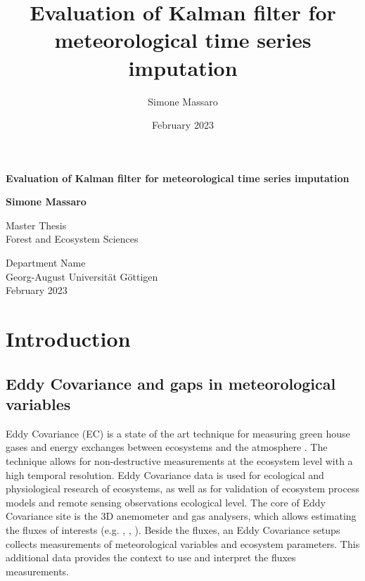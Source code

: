 \documentclass{article}
\title{Evaluation of Kalman filter for meteorological time series imputation}
\author{Simone Massaro}
\date{February 2023}
\let\Oldsection\section
\renewcommand{\section}{\FloatBarrier\Oldsection}
\let\Oldsubsection\subsection
\renewcommand{\subsection}{\FloatBarrier\Oldsubsection}
\begin{document}
\begin{titlepage}
    \begin{center}
        \vspace*{1cm}
            
        \Huge
        \textbf{Evaluation of Kalman filter for meteorological time series imputation}
            
        \vspace{0.5cm}
        \LARGE
            
        \vspace{1.5cm}
            
        \textbf{Simone Massaro}
            
        \vfill
            
        Master Thesis\\
        Forest and Ecosystem Sciences
            
        \vspace{0.3cm}
            
        \Large
        Department Name\\
        Georg-August Universität Göttigen \\
        February 2023
            
    \end{center}
\end{titlepage}
\clearpage
\tableofcontents
\clearpage
\section{Introduction}

\subsection{Eddy Covariance and gaps in meteorological variables}

Eddy Covariance (EC) is a state of the art technique for measuring green house gases and energy exchanges between ecosystems and the atmosphere \cite{aubinet_eddy_2012-1}.  The technique allows for non-destructive measurements at the ecosystem level with a high temporal resolution. Eddy Covariance data is used for ecological and physiological research of ecosystems, as well as for validation of ecosystem process models and remote sensing observations \cite{papale_ideas_2020}  ecological level.
The core of Eddy Covariance site is the 3D anemometer and gas analysers, which allows estimating the fluxes of interests (e.g. , , ). Beside the fluxes, an Eddy Covariance setups collects measurements of meteorological variables and ecosystem parameters. This additional data provides the context to use and interpret the fluxes measurements.
\end{document}
